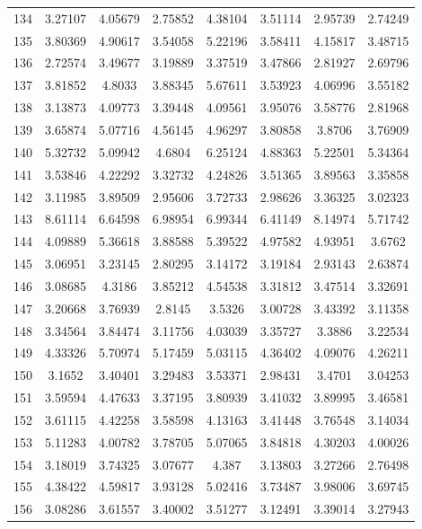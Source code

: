 \begin{center}
\begin{longtable}{cccccccc}
134 & 3.27107 & 4.05679 & 2.75852 & 4.38104 & 3.51114 & 2.95739 & 2.74249\\
135 & 3.80369 & 4.90617 & 3.54058 & 5.22196 & 3.58411 & 4.15817 & 3.48715\\
136 & 2.72574 & 3.49677 & 3.19889 & 3.37519 & 3.47866 & 2.81927 & 2.69796\\
137 & 3.81852 & 4.8033 & 3.88345 & 5.67611 & 3.53923 & 4.06996 & 3.55182\\
138 & 3.13873 & 4.09773 & 3.39448 & 4.09561 & 3.95076 & 3.58776 & 2.81968\\
139 & 3.65874 & 5.07716 & 4.56145 & 4.96297 & 3.80858 & 3.8706 & 3.76909\\
140 & 5.32732 & 5.09942 & 4.6804 & 6.25124 & 4.88363 & 5.22501 & 5.34364\\
141 & 3.53846 & 4.22292 & 3.32732 & 4.24826 & 3.51365 & 3.89563 & 3.35858\\
142 & 3.11985 & 3.89509 & 2.95606 & 3.72733 & 2.98626 & 3.36325 & 3.02323\\
143 & 8.61114 & 6.64598 & 6.98954 & 6.99344 & 6.41149 & 8.14974 & 5.71742\\
144 & 4.09889 & 5.36618 & 3.88588 & 5.39522 & 4.97582 & 4.93951 & 3.6762\\
145 & 3.06951 & 3.23145 & 2.80295 & 3.14172 & 3.19184 & 2.93143 & 2.63874\\
146 & 3.08685 & 4.3186 & 3.85212 & 4.54538 & 3.31812 & 3.47514 & 3.32691\\
147 & 3.20668 & 3.76939 & 2.8145 & 3.5326 & 3.00728 & 3.43392 & 3.11358\\
148 & 3.34564 & 3.84474 & 3.11756 & 4.03039 & 3.35727 & 3.3886 & 3.22534\\
149 & 4.33326 & 5.70974 & 5.17459 & 5.03115 & 4.36402 & 4.09076 & 4.26211\\
150 & 3.1652 & 3.40401 & 3.29483 & 3.53371 & 2.98431 & 3.4701 & 3.04253\\
151 & 3.59594 & 4.47633 & 3.37195 & 3.80939 & 3.41032 & 3.89995 & 3.46581\\
152 & 3.61115 & 4.42258 & 3.58598 & 4.13163 & 3.41448 & 3.76548 & 3.14034\\
153 & 5.11283 & 4.00782 & 3.78705 & 5.07065 & 3.84818 & 4.30203 & 4.00026\\
154 & 3.18019 & 3.74325 & 3.07677 & 4.387 & 3.13803 & 3.27266 & 2.76498\\
155 & 4.38422 & 4.59817 & 3.93128 & 5.02416 & 3.73487 & 3.98006 & 3.69745\\
156 & 3.08286 & 3.61557 & 3.40002 & 3.51277 & 3.12491 & 3.39014 & 3.27943\\

\end{longtable}
\end{center}
